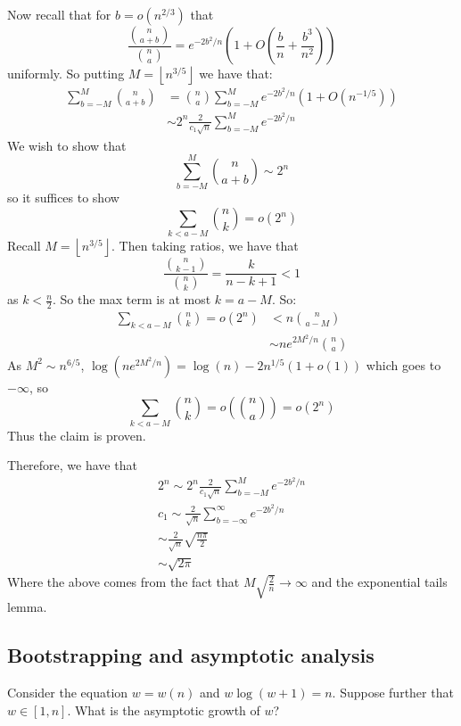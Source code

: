\documentclass[]{article}
\theoremstyle{definition}
\numberwithin{theorem}{section}
\numberwithin{equation}{section}
\begin{document}
	Now recall that for $b = o(n^{2/3})$ that
	\begin{equation}
		\frac{\binom{n}{a + b}}{\binom{n}{a}} = e^{-2 b^2/n}(1 + O(\frac{b}{n} + \frac{b^3}{n^2}))
	\end{equation}
	uniformly. So putting $M = \left\lfloor n^{3/5}\right\rfloor$ we have that:
	\begin{align*}
		\sum_{b = - M}^M \binom{n}{a + b} &= \binom{n}{a} \sum_{b = - M}^{M}e^{-2b^2/n}( 1 + O(n^{-1/5}))\\
		&\sim 2^n \frac{2}{c_1 \sqrt{n}} \sum_{b = - M}^{M}e^{-2b^2/n}
	\end{align*}
	We wish to show that 
	\begin{equation}
		\sum_{b = - M}^M \binom{n}{a + b} \sim 2^n
	\end{equation}
	so it suffices to show
	\begin{equation}
		\sum_{k < a- M} \binom{n}{k} = o(2^n)
	\end{equation}
	Recall $M = \left\lfloor n^{3/5}\right\rfloor$. Then taking ratios, we have that
	\begin{equation}
		\frac{\binom{n}{k - 1}}{\binom{n}{k}} = \frac{k}{n - k + 1}< 1
	\end{equation}
	as $k < \frac{n}{2}$. So the max term is at most $k =  a - M$.
	So:
	\begin{align*}
	\sum_{k < a- M} \binom{n}{k} = o(2^n) &< n \binom{n}{a - M}\\
	&\sim  n e^{2M^2/n}\binom{n}{a}
\end{align*}
As $M^2 \sim n^{6/5}$, $\log(n e^{2M^2/n}) = \log(n) - 2 n^{1/5}(1 + o(1))$ which goes to $- \infty$, so 
	\begin{equation}
	\sum_{k < a- M} \binom{n}{k} = o\left(\binom{n}{a}\right) = o(2^n)
\end{equation}
Thus the claim is proven.

Therefore, we have that 
\begin{align*}
	2^n \sim 2^n \frac{2}{c_1 \sqrt{n}} \sum_{b = - M}^{M}e^{-2b^2/n}\\
	c_1 \sim \frac{2}{\sqrt{n}} \sum_{b = - \infty}^{\infty}e^{-2b^2/n}\\
	\sim \frac{2}{\sqrt{n}} \sqrt{\frac{n\pi}{2}}\\
	\sim \sqrt{2 \pi}
\end{align*}
Where the above comes from the fact that $M \sqrt{\frac{2}{n}} \rightarrow \infty$ and the exponential tails lemma.

\subsection{Bootstrapping and asymptotic analysis}
Consider the equation $w = w(n)$ and $w \log(w + 1) = n$. Suppose further that $w \in [1, n]$. What is the asymptotic growth of $w$?
\end{document}

